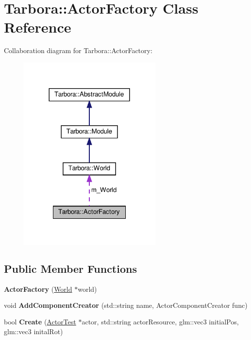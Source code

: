 \hypertarget{classTarbora_1_1ActorFactory}{}\section{Tarbora\+:\+:Actor\+Factory Class Reference}
\label{classTarbora_1_1ActorFactory}


Collaboration diagram for Tarbora\+:\+:Actor\+Factory\+:
\nopagebreak
\begin{figure}[H]
\begin{center}
\leavevmode
\includegraphics[width=204pt]{classTarbora_1_1ActorFactory__coll__graph}
\end{center}
\end{figure}
\subsection*{Public Member Functions}
\begin{DoxyCompactItemize}
\item 
\mbox{\label{classTarbora_1_1ActorFactory_a4242417757093adaaafe82e5639dae7f}} 
{\bfseries Actor\+Factory} (\hyperlink{classTarbora_1_1World}{World} $\ast$world)
\item 
\mbox{\label{classTarbora_1_1ActorFactory_ac74d6cbd05cc1cd9859baa3c10d08222}} 
void {\bfseries Add\+Component\+Creator} (std\+::string name, Actor\+Component\+Creator func)
\item 
\mbox{\label{classTarbora_1_1ActorFactory_a2868cc8c4d2a3ea100507e8734084106}} 
bool {\bfseries Create} (\hyperlink{classTarbora_1_1ActorTest}{Actor\+Test} $\ast$actor, std\+::string actor\+Resource, glm\+::vec3 initial\+Pos, glm\+::vec3 inital\+Rot)
\end{DoxyCompactItemize}

